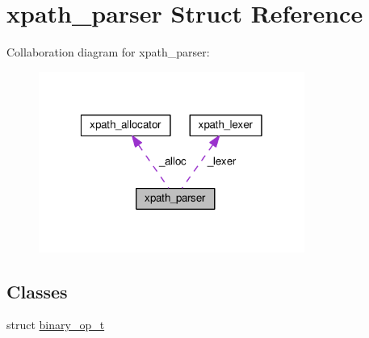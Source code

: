 \hypertarget{structxpath__parser}{\section{xpath\+\_\+parser Struct Reference}
\label{structxpath__parser}
}


Collaboration diagram for xpath\+\_\+parser\+:
\nopagebreak
\begin{figure}[H]
\begin{center}
\leavevmode
\includegraphics[width=247pt]{structxpath__parser__coll__graph}
\end{center}
\end{figure}
\subsection*{Classes}
\begin{DoxyCompactItemize}
\item 
struct \hyperlink{structxpath__parser_1_1binary__op__t}{binary\+\_\+op\+\_\+t}
\end{DoxyCompactItemize}
